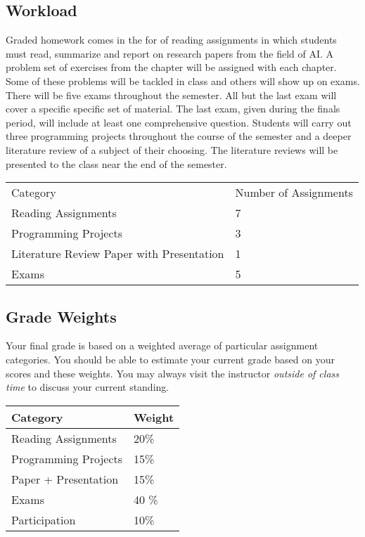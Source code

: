 \documentclass[10pt]{article}
\begin{document}
\subsection{Workload}

Graded homework comes in the for of reading assignments in which students must read, summarize and report on research papers from the field of AI\@.  A problem set of exercises from the chapter will be assigned with each chapter. Some of these problems will be tackled in class and others will show up on exams.  There will be five exams throughout the semester. All but the last exam will cover a specific specific set of material. The last exam, given during the finals period, will include at least one comprehensive question.
Students will carry out three programming projects throughout the course of the semester and a deeper literature review of a subject of their choosing. The literature reviews will be presented to the class near the end of the semester.

\begin{center}
  \begin{tabular}{ll}
    Category & Number of Assignments \\
    Reading Assignments & 7 \\
    Programming Projects & 3 \\
    Literature Review Paper with Presentation & 1 \\
    Exams & 5 \\
  \end{tabular}
\end{center}


\subsection{Grade Weights}

Your final grade is based on a weighted average of particular assignment categories.  You should be able to estimate your current grade based on your scores and these weights.  You may always visit the instructor \textit{outside of class time} to discuss your current standing.
\begin{center}
\begin{tabular}{ll}
  Category & Weight \\ \toprule
  Reading Assignments & 20\% \\ %
  Programming Projects  & 15\% \\ %
  Paper + Presentation & 15\% \\ %
  Exams & 40 \% \\ %
  Participation & 10\%
\end{tabular}
\end{center}
\end{document}
